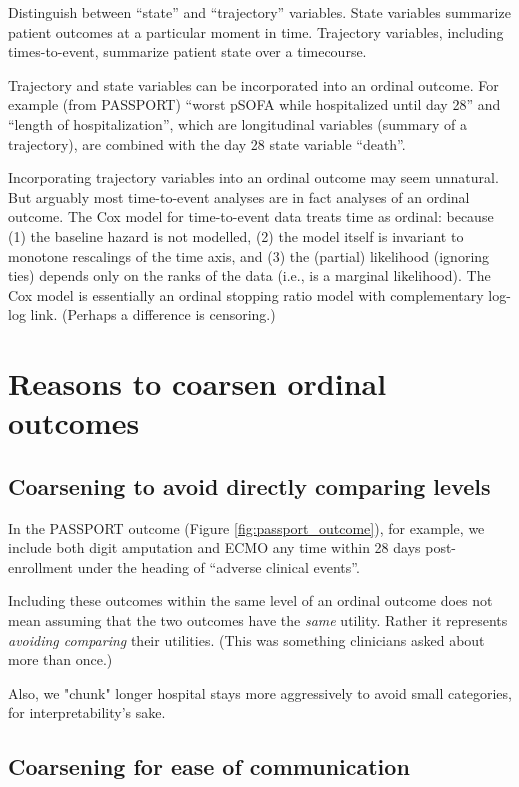 \documentclass[
  11pt,
  fleqn
]{article}
\begin{document}
Distinguish between ``state'' and ``trajectory'' variables. State
variables summarize patient outcomes at a particular moment in time.
Trajectory variables, including times-to-event, summarize patient
state over a timecourse.

Trajectory and state variables can be incorporated into an ordinal outcome. For
example (from PASSPORT) ``worst pSOFA while hospitalized until day 28'' and
``length of hospitalization'', which are longitudinal variables (summary of a
trajectory), are combined with the day 28 state variable ``death''.

Incorporating trajectory variables into an ordinal outcome may seem unnatural.
But arguably most time-to-event analyses are in fact analyses of an
ordinal outcome. The Cox model for time-to-event data treats time as ordinal:
because (1) the baseline hazard is not modelled, (2) the model itself is
invariant to monotone rescalings of the time axis, and (3) the (partial)
likelihood (ignoring ties) depends only on the ranks of the data (i.e., is a
marginal likelihood). The Cox model is essentially an ordinal
stopping ratio model with complementary log-log link. (Perhaps a
difference is censoring.)

\section{Reasons to coarsen ordinal outcomes}

\subsection{Coarsening to avoid directly comparing levels}

In the PASSPORT outcome (Figure \ref{fig:passport_outcome}), for
example, we include both digit
amputation and ECMO
any time within 28 days post-enrollment under the heading of
``adverse clinical events''.

Including these outcomes within the same level of an
ordinal outcome does not mean assuming that the two outcomes have the
\emph{same} utility. Rather it represents \emph{avoiding comparing}
their utilities. (This was something clinicians asked about more than once.)

Also, we "chunk" longer hospital stays more aggressively to avoid
small categories, for interpretability's sake.

\subsection{Coarsening for ease of communication}
\end{document}
